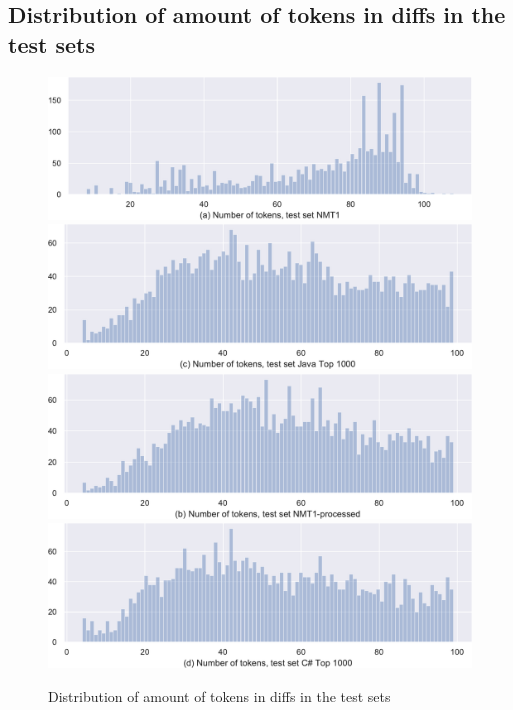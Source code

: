 \subsection{Distribution of amount of tokens in diffs in the test sets}
\begin{figure}[H]

        \includegraphics[width=.45\textwidth]{figs/diff_dist_nmt1.pdf}\hfill
        \includegraphics[width=.45\textwidth]{figs/diff_dist_java1000.pdf} \\[.5cm]
    \includegraphics[width=.45\textwidth]{figs/diff_dist_nmt1_proc.pdf}\hfill
    \includegraphics[width=.45\textwidth]{figs/diff_dist_cs1000.pdf}
    \caption{Distribution of amount of tokens in diffs in the test sets}\label{app:vis:tokendist}
\end{figure}